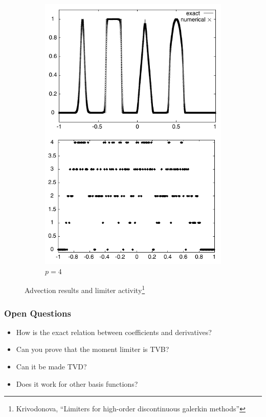 \documentclass[11pt]{beamer}
\begin{document}
\begin{frame}
\begin{figure}[h]
\begin{subfigure}{0.35\textwidth}
      \includegraphics[width=\textwidth]{figures/results/moment-p-4}
      \caption{$p = 4$}
    \end{subfigure}
    \caption{Advection results and limiter activity\footnote{Krivodonova, ``Limiters for high-order discontinuous galerkin methods''}}
  \end{figure}
\end{frame}

\begin{frame}
  \frametitle{Open Questions}
  \begin{itemize}
  \item How is the exact relation between coefficients and derivatives?
  \item Can you prove that the moment limiter is TVB?
  \item Can it be made TVD?
  \item Does it work for other basis functions?
  \end{itemize}
\end{frame}
\end{document}
